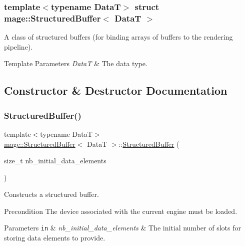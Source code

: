 \subsubsection*{template$<$typename DataT$>$\newline
struct mage\+::\+Structured\+Buffer$<$ Data\+T $>$}

A class of structured buffers (for binding arrays of buffers to the rendering pipeline).


\begin{DoxyTemplParams}{Template Parameters}
{\em DataT} & The data type. \\
\hline
\end{DoxyTemplParams}


\subsection{Constructor \& Destructor Documentation}
\hypertarget{structmage_1_1_structured_buffer_ad384318eca9a617f61f81472ea68f32e}{}\label{structmage_1_1_structured_buffer_ad384318eca9a617f61f81472ea68f32e} 
\subsubsection{\texorpdfstring{Structured\+Buffer()}{StructuredBuffer()}\hspace{0.1cm}{\footnotesize\ttfamily [1/4]}}
{\footnotesize\ttfamily template$<$typename DataT$>$ \\
\hyperlink{structmage_1_1_structured_buffer}{mage\+::\+Structured\+Buffer}$<$ DataT $>$\+::\hyperlink{structmage_1_1_structured_buffer}{Structured\+Buffer} (\begin{DoxyParamCaption}\item[{size\+\_\+t}]{nb\+\_\+initial\+\_\+data\+\_\+elements }\end{DoxyParamCaption})\hspace{0.3cm}{\ttfamily [explicit]}}

Constructs a structured buffer.

\begin{DoxyPrecond}{Precondition}
The device associated with the current engine must be loaded. 
\end{DoxyPrecond}

\begin{DoxyParams}[1]{Parameters}
\mbox{\tt in}  & {\em nb\+\_\+initial\+\_\+data\+\_\+elements} & The initial number of slots for storing data elements to provide. \\
\hline
\end{DoxyParams}
\hypertarget{structmage_1_1_structured_buffer_a7b3a6a86059881526d4ae49dffefb697}{}\label{structmage_1_1_structured_buffer_a7b3a6a86059881526d4ae49dffefb697} 
